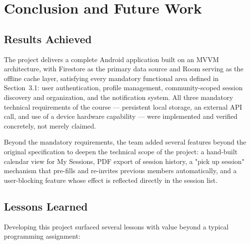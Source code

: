 \section{Conclusion and Future Work}

\subsection{Results Achieved}

The project delivers a complete Android application built on an MVVM architecture, with Firestore as the primary data source and Room serving as the offline cache layer, satisfying every mandatory functional area defined in Section~3.1: user authentication, profile management, community-scoped session discovery and organization, and the notification system. All three mandatory technical requirements of the course — persistent local storage, an external API call, and use of a device hardware capability — were implemented and verified concretely, not merely claimed.

Beyond the mandatory requirements, the team added several features beyond the original specification to deepen the technical scope of the project: a hand-built calendar view for My Sessions, PDF export of session history, a "pick up session" mechanism that pre-fills and re-invites previous members automatically, and a user-blocking feature whose effect is reflected directly in the session list.

\subsection{Lessons Learned}

Developing this project surfaced several lessons with value beyond a typical programming assignment:

